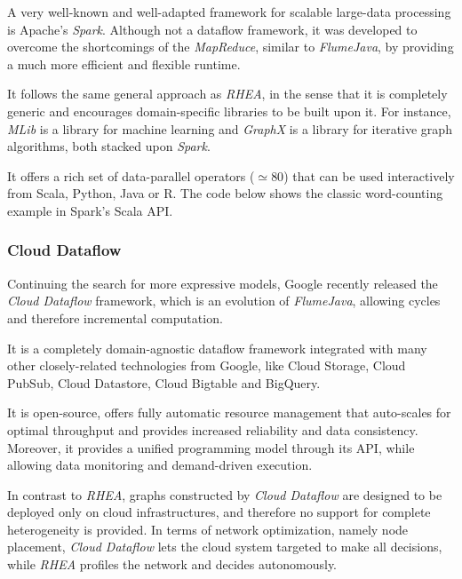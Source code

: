 \documentclass[sigplan,review,anonymous]{acmart}\settopmatter{printfolios=true}
\begin{document}
A very well-known and well-adapted framework for scalable large-data processing is Apache's \textit{Spark}. Although not a dataflow framework, it was developed to overcome the shortcomings of the \textit{MapReduce}, similar to \textit{FlumeJava}, by providing a much more efficient and flexible runtime.

It follows the same general approach as \textit{RHEA}, in the sense that it is completely generic and encourages domain-specific libraries to be built upon it. For instance, \textit{MLib} is a library for machine learning and \textit{GraphX} is a library for iterative graph algorithms, both stacked upon \textit{Spark}.

It offers a rich set of data-parallel operators ($\simeq 80$) that can be used interactively from Scala, Python, Java or R. The code below shows the classic word-counting example in Spark's Scala API.


\subsubsection{Cloud Dataflow}

Continuing the search for more expressive models, Google recently released the \textit{Cloud Dataflow} framework, which is an evolution of \textit{FlumeJava}\cite{flumejava}, allowing cycles and therefore incremental computation.

It is a completely domain-agnostic dataflow framework integrated with many other closely-related technologies from Google, like Cloud Storage, Cloud PubSub, Cloud Datastore, Cloud Bigtable and BigQuery. 

It is open-source, offers fully automatic resource management that auto-scales for optimal throughput and provides increased reliability and data consistency. Moreover, it provides a unified programming model through its API, while allowing data monitoring and demand-driven execution.

In contrast to \textit{RHEA}, graphs constructed by \textit{Cloud Dataflow} are designed to be deployed only on cloud infrastructures, and therefore no support for complete heterogeneity is provided. In terms of network optimization, namely node placement,  \textit{Cloud Dataflow} lets the cloud system targeted to make all decisions, while \textit{RHEA} profiles the network and decides autonomously. 
\end{document}
